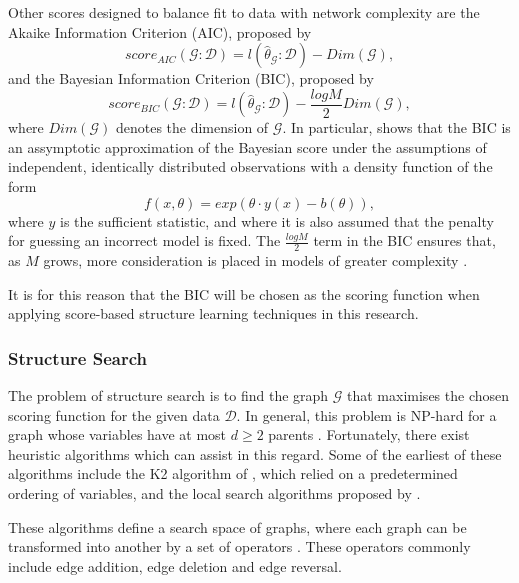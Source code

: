 \documentclass [11pt]{article}
\begin{document}
Other scores designed to balance fit to data with network complexity are the Akaike Information Criterion (AIC), proposed by \citet{akaike98}
\begin{equation*}
score_{AIC}(\mathcal{G}:\mathcal{D}) = l(\hat{\theta}_{\mathcal{G}}:\mathcal{D}) - Dim(\mathcal{G}),
\end{equation*}
and the Bayesian Information Criterion (BIC), proposed by \citet{schwarz78}
\begin{equation*}
score_{BIC}(\mathcal{G}:\mathcal{D}) = l(\hat{\theta}_{\mathcal{G}}:\mathcal{D}) - \frac{logM}{2}Dim(\mathcal{G}),
\end{equation*}
where $Dim(\mathcal{G})$ denotes the dimension of $\mathcal{G}$. In particular, \citet{schwarz78} shows that the BIC is an assymptotic approximation of the Bayesian score under the assumptions of independent, identically distributed observations with a density function of the form
\begin{equation*}
f(x,\theta) = exp(\theta \cdot y(x) - b(\theta)),
\end{equation*}
where $y$ is the sufficient statistic, and where it is also assumed that the penalty for guessing an incorrect model is fixed. The $\frac{logM}{2}$ term in the BIC ensures that, as $M$ grows, more consideration is placed in models of greater complexity \citep{koller09}.

It is for this reason that the BIC will be chosen as the scoring function when applying score-based structure learning techniques in this research.
\subsubsection{Structure Search}\label{StructureSearch}
The problem of structure search is to find the graph $\mathcal{G}$ that maximises the chosen scoring function for the given data $\mathcal{D}$. In general, this problem is NP-hard for a graph whose variables have at most $d\geq 2$ parents \citep{chickering96}. Fortunately, there exist heuristic algorithms which can assist in this regard. Some of the earliest of these algorithms include the K2 algorithm of \citet{cooper92}, which relied on a predetermined ordering of variables, and the local search algorithms proposed by \citet{heckerman95}.

These algorithms define a search space of graphs, where each graph can be transformed into another by a set of operators \citep{koller09}. These operators commonly include edge addition, edge deletion and edge reversal. 
\end{document}
